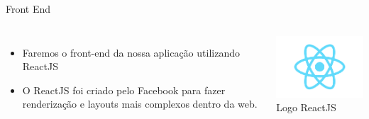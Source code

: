 \documentclass{beamer}
\begin{document}
    \begin{frame}[label=lists]{Front End}
      \begin{columns}[onlytextwidth]
          \begin{itemize}
            \item Faremos o front-end da nossa aplicação utilizando ReactJS 
            \item O ReactJS foi criado pelo Facebook para fazer renderização e layouts mais complexos dentro da web.
          \end{itemize}
            \includegraphics[width=60mm]{resources/aula12_1.png}\\
            \tiny{Logo ReactJS}
      \end{columns}
    \end{frame}

\end{document}
